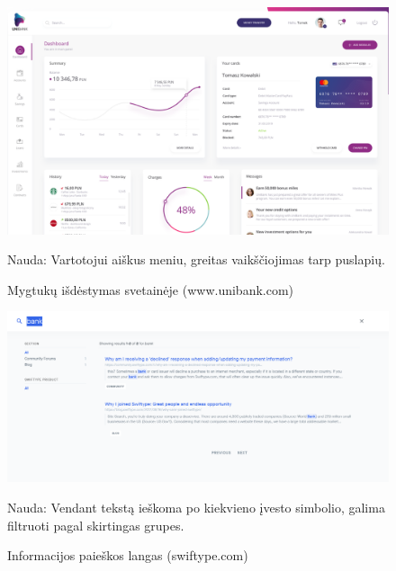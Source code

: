 \documentclass{VUMIFPSkursinis}
\begin{document}
\begin{figure}[!htb]
  \includegraphics[width=\linewidth]{iconPlacement.png}
  \caption{Mygtukų išdėstymas svetainėje (www.unibank.com)}
	\label{fig:iconPlacement}
	Nauda: Vartotojui aiškus meniu, greitas vaikščiojimas tarp puslapių.
\end{figure}
\begin{figure}[!htb]
  \includegraphics[width=\linewidth]{SearchWindow.png}
  \caption{Informacijos paieškos langas (swiftype.com)}
	\label{fig:searchWindow}
	Nauda: Vendant tekstą ieškoma po kiekvieno įvesto simbolio, galima filtruoti pagal skirtingas grupes.
\end{figure}
\end{document}
